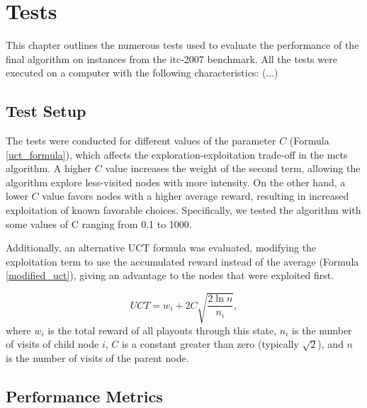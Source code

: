 
\chapter{Tests}


\label{Tests}

This chapter outlines the numerous tests used to evaluate the performance of the final algorithm on instances from the \ac{itc-2007} benchmark. All the tests were executed on a computer with the following characteristics: (...)


\section{Test Setup}

The tests were conducted for different values of the parameter \(C\) (Formula \ref{uct_formula}), which affects the exploration-exploitation trade-off in the \ac{mcts} algorithm. A higher \(C\) value increases the weight of the second term, allowing the algorithm explore less-visited nodes with more intensity. On the other hand, a lower \(C\) value favors nodes with a higher average reward, resulting in increased exploitation of known favorable choices. Specifically, we tested the algorithm with some values of C ranging from 0.1 to 1000.

Additionally, an alternative UCT formula was evaluated, modifying the exploitation term to use the accumulated reward instead of the average (Formula \ref{modified_uct}), giving an advantage to the nodes that were exploited first.

\begin{equation}
UCT = w_i + 2C\sqrt{\frac{2\ln{n}}{n_i}},\label{modified_uct}
\end{equation} where \(w_i\) is the total reward of all playouts through this state, \(n_i\) is the number of visits of child node \(i\), \(C\) is a constant greater than zero (typically \(\sqrt{2}\)), and \(n\) is the number of visits of the parent node.
	
	
\section{Performance Metrics}

